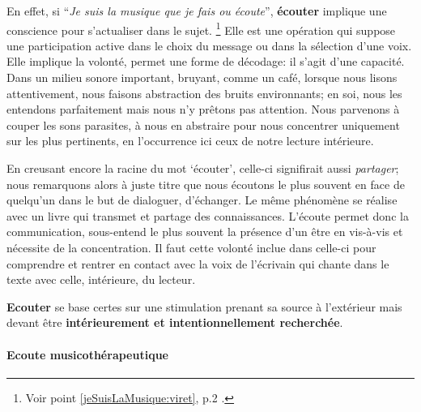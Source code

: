 En effet, si \enquote{\emph{Je suis la musique que je fais ou écoute}}\autocite{viret:b}, \textbf{écouter} implique 
une conscience pour s'actualiser dans le sujet. \footnote{Voir point
  \ref{jeSuisLaMusique:viret}, p.2 \pageref{jeSuisLaMusique:viret}.}
Elle est une opération 
qui suppose une participation active dans le choix du message
ou dans la sélection d'une voix. Elle  implique la volonté,
permet une forme de décodage: il s'agit d'une capacité.
Dans un milieu sonore important,
 bruyant, comme un café, lorsque nous lisons attentivement, nous faisons abstraction
des bruits environnants; en soi, nous les entendons parfaitement mais nous n'y
prêtons pas attention. Nous parvenons à couper les sons parasites, à nous en abstraire pour
nous concentrer uniquement sur les plus  pertinents, en l'occurrence
ici ceux de notre lecture intérieure.




  En creusant encore la racine du mot `écouter', celle-ci signifirait aussi \emph{partager}; nous
  remarquons alors à juste titre que nous écoutons le plus souvent en
  face de quelqu'un dans le but de dialoguer, d'échanger. Le même
  phénomène se réalise avec un livre qui transmet et partage des
  connaissances. L'écoute permet donc la communication, sous-entend le
  plus souvent la présence d'un être en vis-à-vis et nécessite de la
  concentration. Il faut cette volonté inclue dans celle-ci  pour
  comprendre et rentrer en contact avec la voix de  l'écrivain qui
  chante dans le texte avec celle, intérieure, du lecteur.

  
 \textbf{Ecouter} se base certes sur une stimulation prenant sa source à 
l'extérieur mais devant être \textbf{ intérieurement et intentionnellement
	recherchée}.




      \paragraph{Ecoute musicothérapeutique}
      

